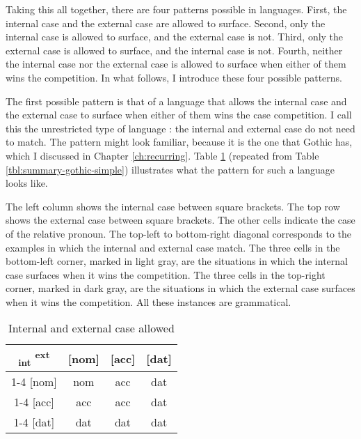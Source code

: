 Taking this all together, there are four patterns possible in languages. First, the internal case and the external case are allowed to surface. Second, only the internal case is allowed to surface, and the external case is not. Third, only the external case is allowed to surface, and the internal case is not. Fourth, neither the internal case nor the external case is allowed to surface when either of them wins the competition. In what follows, I introduce these four possible patterns.

The first possible pattern is that of a language that allows the internal case and the external case to surface when either of them wins the case competition. I call this the unrestricted type of language \citep[just as cf.][]{grosu1987,cinqueforthcoming}: the internal and external case do not need to match. The pattern might look familiar, because it is the one that Gothic has, which I discussed in Chapter \ref{ch:recurring}. Table \ref{tbl:case-competition-int-ext} (repeated from Table \ref{tbl:summary-gothic-simple}) illustrates what the pattern for such a language looks like.

The left column shows the internal case between square brackets. The top row shows the external case between square brackets. The other cells indicate the case of the relative pronoun.
The top-left to bottom-right diagonal corresponds to the examples in which the internal and external case match. The three cells in the bottom-left corner, marked in light gray, are the situations in which the internal case surfaces when it wins the competition. The three cells in the top-right corner, marked in dark gray, are the situations in which the external case surfaces when it wins the competition.
All these instances are grammatical.

\begin{table}[ht]
  \center
  \caption{Internal and external case allowed}
  \begin{tabular}{c|c|c|c}
    \toprule
    \textsubscript{\ac{int}} \textsuperscript{\ac{ext}}
           & [\ac{nom}]
           & [\ac{acc}]
           & [\ac{dat}]
           \\ \cmidrule{1-4}
       [\ac{nom}]
           & \ac{nom}
           & \cellcolor{DG}\ac{acc}
           & \cellcolor{DG}\ac{dat}
           \\ \cmidrule{1-4}
       [\ac{acc}]
           & \cellcolor{LG}\ac{acc}
           & \ac{acc}
           & \cellcolor{DG}\ac{dat}
           \\ \cmidrule{1-4}
       [\ac{dat}]
           & \cellcolor{LG}\ac{dat}
           & \cellcolor{LG}\ac{dat}
           & \ac{dat}
           \\
     \bottomrule
  \end{tabular}
    \label{tbl:case-competition-int-ext}
\end{table}


